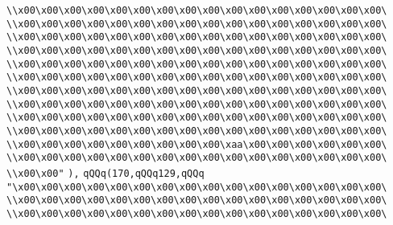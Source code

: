 \verb|\\x00\x00\x00\x00\x00\x00\x00\x00\x00\x00\x00\x00\x00\x00\x00\x00\|\newline
\verb|\\x00\x00\x00\x00\x00\x00\x00\x00\x00\x00\x00\x00\x00\x00\x00\x00\|\newline
\verb|\\x00\x00\x00\x00\x00\x00\x00\x00\x00\x00\x00\x00\x00\x00\x00\x00\|\newline
\verb|\\x00\x00\x00\x00\x00\x00\x00\x00\x00\x00\x00\x00\x00\x00\x00\x00\|\newline
\verb|\\x00\x00\x00\x00\x00\x00\x00\x00\x00\x00\x00\x00\x00\x00\x00\x00\|\newline
\verb|\\x00\x00\x00\x00\x00\x00\x00\x00\x00\x00\x00\x00\x00\x00\x00\x00\|\newline
\verb|\\x00\x00\x00\x00\x00\x00\x00\x00\x00\x00\x00\x00\x00\x00\x00\x00\|\newline
\verb|\\x00\x00\x00\x00\x00\x00\x00\x00\x00\x00\x00\x00\x00\x00\x00\x00\|\newline
\verb|\\x00\x00\x00\x00\x00\x00\x00\x00\x00\x00\x00\x00\x00\x00\x00\x00\|\newline
\verb|\\x00\x00\x00\x00\x00\x00\x00\x00\x00\x00\x00\x00\x00\x00\x00\x00\|\newline
\verb|\\x00\x00\x00\x00\x00\x00\x00\x00\x00\xaa\x00\x00\x00\x00\x00\x00\|\newline
\verb|\\x00\x00\x00\x00\x00\x00\x00\x00\x00\x00\x00\x00\x00\x00\x00\x00\|\newline
\verb|\\x00\x00"|\newline
\verb|),|\newline
\verb|qQQq(170,qQQq129,qQQq|\newline
\verb|"\x00\x00\x00\x00\x00\x00\x00\x00\x00\x00\x00\x00\x00\x00\x00\x00\|\newline
\verb|\\x00\x00\x00\x00\x00\x00\x00\x00\x00\x00\x00\x00\x00\x00\x00\x00\|\newline
\verb|\\x00\x00\x00\x00\x00\x00\x00\x00\x00\x00\x00\x00\x00\x00\x00\x00\|\newline
